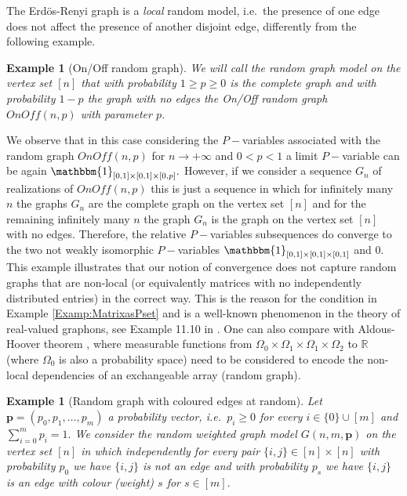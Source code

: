 \documentclass[11pt]{article}
\newtheorem{example}[theorem]{Example}
\def\R{\mathbb{R}}
\begin{document}
The Erd\"os-Renyi graph is a \emph{local} random model, i.e.\ the presence of one edge does not affect the presence of another disjoint edge, differently from the following example.

\begin{example}[On/Off random graph]
We will call the random graph model on the vertex set $[n]$ that with probability $1\geq p\geq0$ is the complete graph and with probability $1-p$ the graph with no edges the \emph{On/Off random graph}  $OnOff(n,p)$ with parameter $p$.
\end{example}
We observe that in this case considering the $P-$variables associated with the random graph $OnOff(n,p)$ for $n\rightarrow +\infty$ and $0<p<1$ a limit $P-$variable can be again $\mathbbm{1}_{[0,1]\times [0,1]\times [0,p]}.$ However, if we consider a sequence $G_n$ of realizations of $OnOff(n,p)$ this is just a sequence in which for infinitely many $n$ the graphs $G_n$ are the complete graph on the vertex set $[n]$ and for the remaining infinitely many $n$ the graph $G_n$ is the graph on the vertex set $[n]$ with no edges. Therefore, the relative $P-$variables subsequences do converge to the two not weakly isomorphic $P-$variables $\mathbbm{1}_{[0,1]\times [0,1]\times [0,1]}$ and $0.$ This example illustrates that our notion of convergence does not capture random graphs that are non-local (or equivalently matrices with no independently distributed entries) in the correct way. This is the reason for the condition in Example \ref{Examp:MatrixasPset} and is a well-known phenomenon in the theory of real-valued graphons, see Example 11.10 in \cite{LovaszGraphLimits}. One can also compare with Aldous-Hoover theorem \cite{aldous1981representations,hoover1979relations,aldous2010exchangeability}, where measurable functions from $\Omega_0\times \Omega_1\times \Omega_1\times \Omega_2$ to $\R$ (where $\Omega_0$ is also a probability space) need to be considered to encode the non-local dependencies of an exchangeable array (random graph).         


\begin{example}[Random graph with coloured edges at random]
Let $\mathbf{p}=(p_0,p_1,\ldots,p_m)$ a probability vector, i.e.\ $p_i\geq 0$ for every $i\in \{0\}\cup [m]$ and $\sum^{m}_{i=0}p_i=1.$ We consider the random weighted graph model $G(n,m,\mathbf{p})$ on the vertex set $[n]$ in which independently for every pair $\{i,j\}\in [n]\times [n]$ with probability $p_0$ we have $\{i,j\}$ is not an edge and with probability $p_s$ we have $\{i,j\}$ is an edge with colour (weight) $s$ for $s\in [m].$
\end{example}
\end{document}

